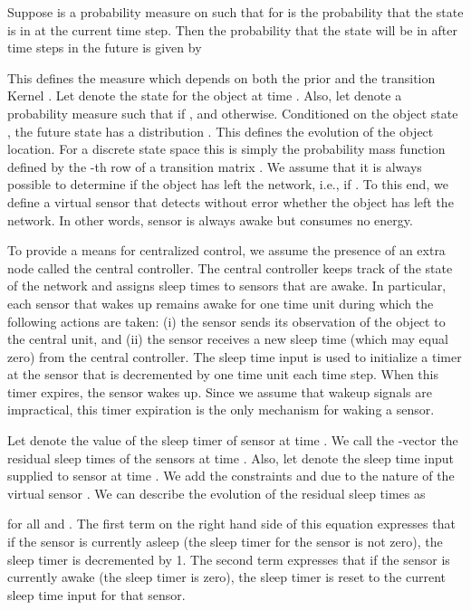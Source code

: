 \documentclass[journal,draftcls,onecolumn,11pt]{IEEEtran}
\begin{document}
Suppose  is a probability measure on  such that  for  is the probability that the state is in  at the current time step.  Then the probability that the state will be in  after  time steps in the future is given by

This defines the measure  which depends on both the prior  and the transition Kernel .  Let  denote the state for the object at time .  Also, let  denote a probability measure such that  if , and  otherwise. Conditioned on the object state , the future state  has a distribution . This defines the evolution of the object location. For a discrete state space this is simply the probability mass function defined by the -th row of a transition matrix .
We assume that it is always possible to determine if the object has left the network, i.e., if .  To this end, we define a virtual sensor  that detects without error whether the object has left the network. In other words, sensor  is always awake but consumes no energy.

To provide a means for centralized control, we assume the presence of an extra node called the central controller.  The central controller keeps track of the state of the network and assigns sleep times to sensors that are awake.  In particular, each sensor that wakes up remains awake for one time unit during which the following actions are taken: (i) the sensor sends its observation of the object to the central unit, and (ii) the sensor receives a new sleep time (which may equal zero) from the central controller.  The sleep time input is used to initialize a timer at the sensor that is decremented by one time unit each time step.  When this timer expires, the sensor wakes up.  Since we assume that wakeup signals are impractical, this timer expiration is the only mechanism for waking a sensor.

Let  denote the value of the sleep timer of sensor  at time .  We call the -vector  the residual sleep times of the sensors at time .  Also, let  denote the sleep time input supplied to sensor  at time .  We add the constraints  and  due to the nature of the virtual sensor .  We can describe the evolution of the residual sleep times as

for all  and .  The first term on the right hand side of this equation expresses that if the sensor is currently asleep (the sleep timer for the sensor is not zero), the sleep timer is decremented by 1.  The second term expresses that if the sensor is currently awake (the sleep timer is zero), the sleep timer is reset to the current sleep time input for that sensor.
\end{document}
